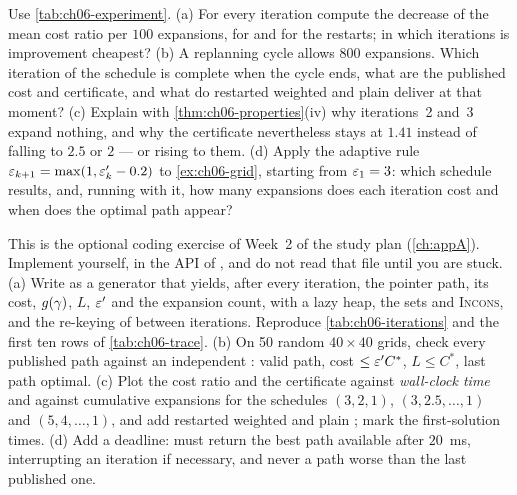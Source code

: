 \begin{exercise}[\difficulty{2}]
\label{exr:ch06-schedule}
Use \cref{tab:ch06-experiment}. (a) For every iteration compute the decrease
of the mean cost ratio per $100$ expansions, for \arastar and for the
restarts; in which iterations is improvement cheapest? (b) A replanning cycle
allows $800$ expansions. Which iteration of the schedule is complete when the
cycle ends, what are the published cost and certificate, and what do restarted
weighted \astar and plain \astar deliver at that moment? (c) Explain with
\cref{thm:ch06-properties}(iv) why iterations~2 and~3 expand nothing, and why
the certificate nevertheless stays at $1.41$ instead of falling to $2.5$ or
$2$ --- or rising to them. (d) Apply the adaptive rule $\varepsilon_{k+1} = \max(1,
\varepsilon'_k - 0.2)$ to \cref{ex:ch06-grid}, starting from $\varepsilon_1 = 3$: which
schedule results, and, running  with it, how many expansions
does each iteration cost and when does the optimal path appear?
\end{exercise}

\begin{exercise}
\label{exr:ch06-coding}
This is the optional coding exercise of Week~2 of the study plan
(\cref{ch:appA}). Implement \arastar yourself, in the API of
, and do not read that file until you are stuck.
(a) Write  as a generator
that yields, after every iteration, the pointer path, its cost,
$g(\gamma)$, $L$, $\varepsilon'$ and the expansion count, with a lazy heap, the
sets \Closed and \textsc{Incons}, and the re-keying of \Open between
iterations. Reproduce \cref{tab:ch06-iterations} and the first ten rows of
\cref{tab:ch06-trace}. (b) On 50 random $40 \times 40$ grids, check every
published path against an independent \astar: valid path, cost $\le \varepsilon'
C^*$, $L \le C^*$, last path optimal. (c) Plot the cost ratio and the
certificate against \emph{wall-clock time} and against cumulative expansions
for the schedules $(3, 2, 1)$, $(3, 2.5, \dots, 1)$ and $(5, 4, \dots, 1)$,
and add restarted weighted \astar and plain \astar; mark the first-solution
times. (d) Add a deadline:  must return the best
path available after $20$~ms, interrupting an iteration if necessary, and
never a path worse than the last published one.
\end{exercise}

